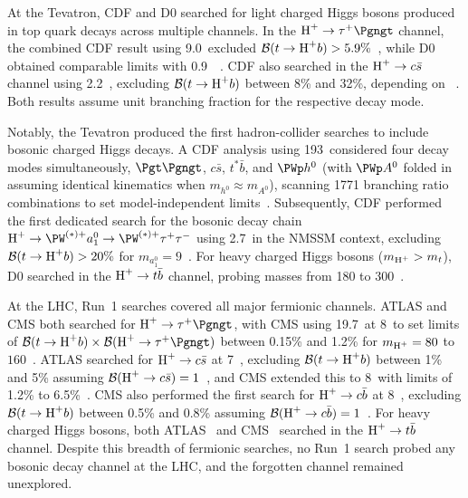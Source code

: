 At the Tevatron, CDF and D0 searched for light charged Higgs bosons produced in top quark decays across multiple channels. In the $\PHp \to \PGtp\Pgngt$ channel, the combined CDF result using 9.0~\fbinv excluded $\mathcal{B}(t \to \text{H}^+ b) > 5.9\%$~\cite{CDF:2014pib}, while D0 obtained comparable limits with 0.9~\fbinv~\cite{D0:2009gla}. CDF also searched in the $\text{H}^+ \to c\bar{s}$ channel using 2.2~\fbinv, excluding $\mathcal{B}(t \to \text{H}^+ b)$ between 8\% and 32\%, depending on \mHc~\cite{CDF:2009bms}. Both results assume unit branching fraction for the respective \PHp decay mode.

Notably, the Tevatron produced the first hadron-collider searches to include bosonic charged Higgs decays. A CDF analysis using 193~\pbinv considered four decay modes simultaneously, $\Pgt\Pgngt$, $c\bar{s}$, $t^*\bar{b}$, and $\PWp h^0$ (with $\PWp A^0$ folded in assuming identical kinematics when $m_{h^0} \approx m_{A^0}$), scanning 1771 branching ratio combinations to set model-independent limits~\cite{CDF:2005kth}. Subsequently, CDF performed the first dedicated search for the bosonic decay chain $\PHp \to \PW^{(*)+} a_1^0 \to \PW^{(*)+} \PGtp\PGtm$ using 2.7~\fbinv in the NMSSM context, excluding $\mathcal{B}(t \to \text{H}^+ b) > 20\%$ for $m_{a_1^0} = 9$\GeV~\cite{CDF:2011bqh}. For heavy charged Higgs bosons ($m_{\text{H}^+} > m_t$), D0 searched in the $\text{H}^+ \to t\bar{b}$ channel, probing masses from 180 to $300$\GeV~\cite{D0:2008xjp}.

At the LHC, Run~1 searches covered all major fermionic channels. ATLAS and CMS both searched for $\PHp \to \PGtp\Pgngt$, with CMS using 19.7~\fbinv at 8~\TeV to set limits of $\mathcal{B}(t \to \PHp b) \times \mathcal{B}(\PHp \to \PGtp\Pgngt)$ between 0.15\% and 1.2\% for $m_{\text{H}^+} = 80$ to $160$\GeV~\cite{CMS:2015lsf}. ATLAS searched for $\text{H}^+ \to c\bar{s}$ at 7~\TeV, excluding $\mathcal{B}(t \to \text{H}^+ b)$ between 1\% and 5\% assuming $\mathcal{B}(\text{H}^+ \to c\bar{s}) = 1$~\cite{ATLAS:2013uxj}, and CMS extended this to 8~\TeV with limits of 1.2\% to 6.5\%~\cite{CMS:2015yvc}. CMS also performed the first search for $\text{H}^+ \to c\bar{b}$ at 8~\TeV, excluding $\mathcal{B}(t \to \text{H}^+ b)$ between 0.5\% and 0.8\% assuming $\mathcal{B}(\text{H}^+ \to c\bar{b}) = 1$~\cite{CMS:2018dzl}. For heavy charged Higgs bosons, both ATLAS~\cite{ATLAS:2015nkq} and CMS~\cite{CMS:2015lsf} searched in the $\text{H}^+ \to t\bar{b}$ channel. Despite this breadth of fermionic searches, no Run~1 search probed any bosonic \PHc decay channel at the LHC, and the forgotten channel remained unexplored.

